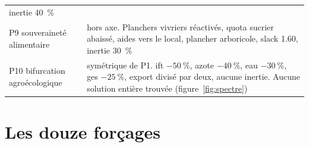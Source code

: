 \begin{table}[H]
\begin{tabularx}{\textwidth}{@{}p{27mm}X@{}}
      inertie \SI{40}{\percent} \\
    P9 souveraineté alimentaire & hors axe. Planchers vivriers réactivés, quota sucrier
      abaissé, aides vers le local, plancher arboricole, slack \num{1.60}, inertie
      \SI{30}{\percent} \\
    P10 bifurcation agroécologique & symétrique de P1. \gls{ift} $-\SI{50}{\percent}$, azote
      $-\SI{40}{\percent}$, eau $-\SI{30}{\percent}$, \gls{ges} $-\SI{25}{\percent}$, export
      divisé par deux, aucune inertie. Aucune solution entière trouvée
      (figure~\ref{fig:spectre}) \\
    \bottomrule
  \end{tabularx}
\end{table}

\section{Les douze forçages}

